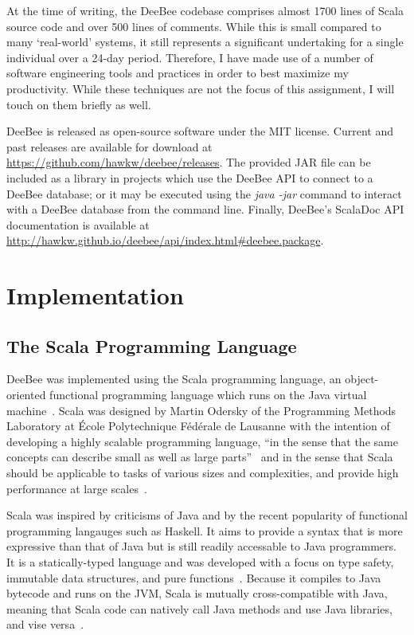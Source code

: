 At the time of writing, the DeeBee codebase comprises almost 1700 lines of Scala source code and over 500 lines of comments. While this is small compared to many `real-world' systems, it still represents a significant undertaking for a single individual over a 24-day period. Therefore, I have made use of a number of software engineering tools and practices in order to best maximize my productivity. While these techniques are not the focus of this assignment, I will touch on them briefly as well.

DeeBee is released as open-source software under the MIT license. Current and past releases are available for download at \url{https://github.com/hawkw/deebee/releases}. The provided JAR file can be included as a library in projects which use the DeeBee API to connect to a DeeBee database; or it may be executed using the \textit{java -jar} command to interact with a DeeBee database from the command line. Finally, DeeBee's ScalaDoc API documentation is available at \url{http://hawkw.github.io/deebee/api/index.html#deebee.package}.

\section{Implementation}

\subsection{The Scala Programming Language}

DeeBee was implemented using the Scala programming language, an object-oriented functional programming language which runs on the Java virtual machine~\cite{odersky2004scala,odersky2004overview,odersky2008programming}. Scala was designed by Martin Odersky of the Programming Methods Laboratory at \'Ecole Polytechnique F\'ed\'erale de Lausanne with the intention of developing a highly scalable programming language, ``in the sense that the same concepts can describe small as well as large parts''~\cite{odersky2004scala} and in the sense that Scala should be applicable to tasks of various sizes and complexities, and provide high performance at large scales~\cite{odersky2008programming}. 

Scala was inspired by criticisms of Java and by the recent popularity of functional programming langauges such as Haskell. It aims to provide a syntax that is more expressive than that of Java but is still readily accessable to Java programmers. It is a statically-typed language and was developed with a focus on type safety, immutable data structures, and pure functions~\cite{odersky2004scala,odersky2004overview,odersky2008programming}. Because it compiles to Java bytecode and runs on the JVM, Scala is mutually cross-compatible with Java, meaning that Scala code can natively call Java methods and use Java libraries, and vise versa~\cite{odersky2008programming}.

